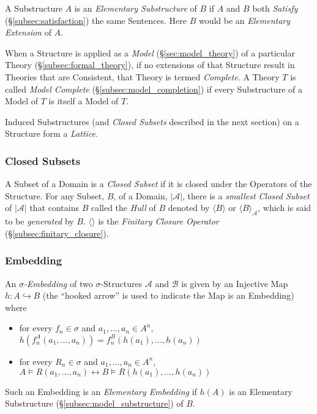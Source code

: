 A Substructure $A$ is an \emph{Elementary Substructure} of $B$ if $A$
and $B$ both \emph{Satisfy} (\S\ref{subsec:satisfaction}) the same
Sentences. Here $B$ would be an \emph{Elementary Extension} of $A$.

When a Structure is applied as a \emph{Model}
(\S\ref{sec:model_theory}) of a particular Theory
(\S\ref{subsec:formal_theory}), if no extensions of that Structure
result in Theories that are Consistent, that Theory is termed
\emph{Complete}. A Theory $T$ is called \emph{Model Complete}
(\S\ref{subsec:model_completion}) if every Substructure of a Model of
$T$ is itself a Model of $T$.

Induced Substructures (and \emph{Closed Subsets} described in the next
section) on a Structure form a \emph{Lattice}.



\subsubsection{Closed Subsets}

A Subset of a Domain is a \emph{Closed Subset} if it is closed under
the Operators of the Structure. For any Subset, $B$, of a Domain,
$|\mathcal{A}|$, there is a \emph{smallest Closed Subset} of
$|\mathcal{A}|$ that contains $B$ called the \emph{Hull} of $B$
denoted by $\langle B \rangle$ or $\langle B \rangle_{\mathcal{A}}$,
which is said to be \emph{generated} by $B$. $\langle \rangle$ is the
\emph{Finitary Closure Operator} (\S\ref{subsec:finitary_closure}).



\subsubsection{Embedding}\label{subsec:sigma_embedding}


An \emph{$\sigma$-Embedding} of two $\sigma$-Structures $\mathcal{A}$
and $\mathcal{B}$ is given by an Injective Map $h: A \hookrightarrow
B$ (the ``hooked arrow'' is used to indicate the Map is an Embedding)
where
\begin{itemize}
\item for every $f_n \in \sigma$ and $a_1, \ldots, a_n \in A^n$,
  $h(f_{n}^A(a_1,\ldots,a_n)) = f_{n}^B(h(a_1),\ldots,h(a_n))$
\item for every $R_n \in \sigma$ and $a_1, \ldots, a_n \in A^n$, $A
  \vDash R(a_1, \ldots, a_n) \leftrightarrow B \vDash R(h(a_1),
  \ldots, h(a_n))$
\end{itemize}
Such an Embedding is an \emph{Elementary Embedding} if $h(A)$ is an
Elementary Substructure (\S\ref{subsec:model_substructure}) of $B$.



